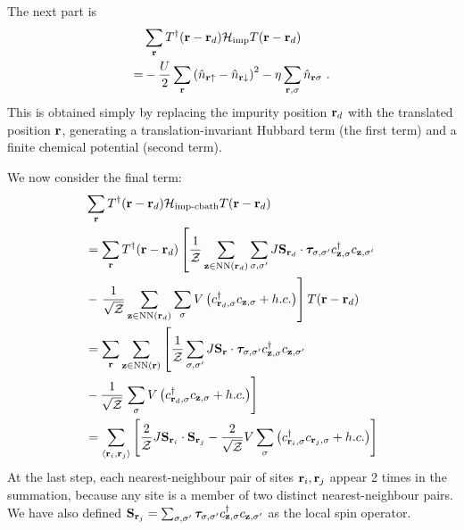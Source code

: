 \documentclass[reprint,hidelinks,onecolumn]{revtex4-2}
\begin{document}
The next part is
\begin{equation}\begin{aligned}
	&\sum_{{\bf r}}T^\dagger({\bf r} - {\bf r}_d)\mathcal{H}_\text{imp}T({\bf r} - {\bf r}_d) \\
	=& -\frac{U}{2}\sum_{{\bf r}}\left(\hat n_{{\bf r} \uparrow} - \hat n_{{\bf r} \downarrow} \right)^2 - \eta\sum_{{\bf r},\sigma} \hat n_{{\bf r}\sigma}~.
\end{aligned}\end{equation}
This is obtained simply by replacing the impurity position \({\bf r}_d\) with the translated position \({\bf r}\), generating a translation-invariant Hubbard term (the first term) and a finite chemical potential (second term).

We now consider the final term:
\begin{equation}\begin{aligned}
	&\sum_{{\bf r}}T^\dagger({\bf r} - {\bf r}_d)\mathcal{H}_\text{imp-cbath}T({\bf r} - {\bf r}_d)\\
	&=\sum_{{\bf r}}T^\dagger({\bf r} - {\bf r}_d)\left[\frac{1}{\mathcal{Z}}\sum_{{\bf z}\in\text{NN}({\bf r}_d)}\sum_{\sigma,\sigma^\prime}J {\bf S}_{{\bf r}_d}\cdot{\boldsymbol \tau}_{\sigma,\sigma^\prime}c^\dagger_{{\bf z},\sigma}c_{{\bf z},\sigma^\prime} \right.\\
				     &-  \left. \frac{1}{\sqrt\mathcal{Z}}\sum_{{\bf z}\in\text{NN}({\bf r}_d)}\sum_{\sigma} V \left(c^\dagger_{{\bf r}_d,\sigma} c_{{{\bf z}},\sigma} + h.c.\right)\right]T({\bf r} - {\bf r}_d)\\
	&=\sum_{{\bf r}}\sum_{{\bf z}\in\text{NN}({\bf r})}\left[\frac{1}{\mathcal{Z}}\sum_{\sigma,\sigma^\prime}J {\bf S}_{{\bf r}}\cdot{\boldsymbol \tau}_{\sigma,\sigma^\prime}c^\dagger_{{\bf z},\sigma}c_{{\bf z},\sigma^\prime} \right.\\
				     &-  \frac{1}{\sqrt\mathcal{Z}}\left.\sum_{\sigma} V\left(c^\dagger_{{\bf r}_d,\sigma} c_{{{\bf z}},\sigma} + h.c.\right)\right]\\
					 &=\sum_{\left< {\bf r}_i, {\bf r}_j\right>}\left[\frac{2}{\mathcal{Z}}J {\bf S}_{{\bf r}_i}\cdot{\bf S}_{{\bf r}_j} - \frac{2}{\sqrt\mathcal{Z}}V \sum_{\sigma}\left(c^\dagger_{{\bf r}_i,\sigma} c_{{{\bf r}_j},\sigma} + h.c.\right)\right]\\
\end{aligned}\end{equation}
At the last step, each nearest-neighbour pair of sites \({\bf r}_i, {\bf r}_j\) appear 2 times in the summation, because any site is a member of two distinct nearest-neighbour pairs. We have also defined \({\bf S}_{{\bf r}_j} =\sum_{\sigma,\sigma^\prime} {\boldsymbol \tau}_{\sigma,\sigma^\prime}c^\dagger_{{\bf z},\sigma}c_{{\bf z},\sigma^\prime}\) as the local spin operator.
\end{document}
